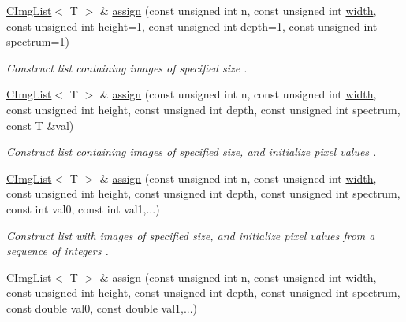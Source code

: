 \begin{DoxyCompactItemize}
\hyperlink{structcimg__library__suffixed_1_1CImgList}{C\+Img\+List}$<$ T $>$ \& \hyperlink{structcimg__library__suffixed_1_1CImgList_a84339e54f3d53a5e07e3ceb38bb3d07e}{assign} (const unsigned int n, const unsigned int \hyperlink{structcimg__library__suffixed_1_1CImgList_a60d81967a11f946a46ab28f2f14109f7}{width}, const unsigned int height=1, const unsigned int depth=1, const unsigned int spectrum=1)
\begin{DoxyCompactList}\small\item\em Construct list containing images of specified size . \end{DoxyCompactList}\item 
\hyperlink{structcimg__library__suffixed_1_1CImgList}{C\+Img\+List}$<$ T $>$ \& \hyperlink{structcimg__library__suffixed_1_1CImgList_ae1b6957950d585e53e9220c488e002c2}{assign} (const unsigned int n, const unsigned int \hyperlink{structcimg__library__suffixed_1_1CImgList_a60d81967a11f946a46ab28f2f14109f7}{width}, const unsigned int height, const unsigned int depth, const unsigned int spectrum, const T \&val)
\begin{DoxyCompactList}\small\item\em Construct list containing images of specified size, and initialize pixel values . \end{DoxyCompactList}\item 
\hyperlink{structcimg__library__suffixed_1_1CImgList}{C\+Img\+List}$<$ T $>$ \& \hyperlink{structcimg__library__suffixed_1_1CImgList_aa11963ba03b788a1a1a336893ed7ea7d}{assign} (const unsigned int n, const unsigned int \hyperlink{structcimg__library__suffixed_1_1CImgList_a60d81967a11f946a46ab28f2f14109f7}{width}, const unsigned int height, const unsigned int depth, const unsigned int spectrum, const int val0, const int val1,...)
\begin{DoxyCompactList}\small\item\em Construct list with images of specified size, and initialize pixel values from a sequence of integers . \end{DoxyCompactList}\item 
\hyperlink{structcimg__library__suffixed_1_1CImgList}{C\+Img\+List}$<$ T $>$ \& \hyperlink{structcimg__library__suffixed_1_1CImgList_a0ced7de4776d986e08470f68921831f4}{assign} (const unsigned int n, const unsigned int \hyperlink{structcimg__library__suffixed_1_1CImgList_a60d81967a11f946a46ab28f2f14109f7}{width}, const unsigned int height, const unsigned int depth, const unsigned int spectrum, const double val0, const double val1,...)

\end{DoxyCompactItemize}
